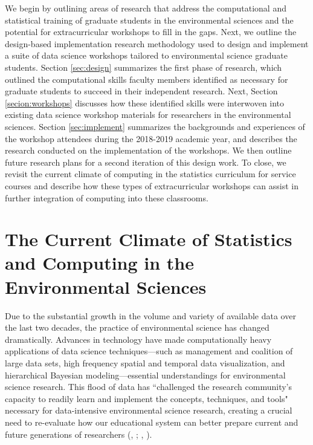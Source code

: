 \documentclass[12pt]{article}
\begin{document}
\quad We begin by outlining areas of research that address the computational and
statistical training of graduate students in the environmental sciences and the 
potential for extracurricular workshops to fill in the gaps. Next, we outline 
the design-based implementation research methodology used to design and 
implement a suite of data science workshops tailored to environmental science 
graduate students. Section \ref{sec:design} summarizes the first phase of 
research, which outlined the computational skills faculty members identified as 
necessary for graduate students to succeed in their independent research. Next, 
Section \ref{secion:workshops} discusses how these identified skills were 
interwoven into existing data science workshop materials for researchers in the 
environmental sciences. Section \ref{sec:implement} summarizes the backgrounds 
and experiences of the workshop attendees during the 2018-2019 academic year, 
and describes the research conducted on the implementation of the workshops. We 
then outline future research plans for a second iteration of this design work. 
To close, we revisit the current climate of computing in the statistics 
curriculum for service courses and describe how these types of extracurricular 
workshops can assist in further integration of computing into these classrooms. 

\section{The Current Climate of Statistics and Computing in the Environmental 
Sciences}
\label{sec:lit}

\quad Due to the substantial growth in the volume and variety of available data 
over the last two decades, the practice of environmental science has changed 
dramatically. Advances in technology have made computationally heavy 
applications of data science techniques---such as management and coalition of 
large data sets, high frequency spatial and temporal data visualization, and 
hierarchical Bayesian modeling---essential understandings for environmental 
science research. This flood of data has ``challenged the research community's 
capacity to readily learn and implement the concepts, techniques, and tools" 
\citep[p. 546]{hampton} necessary for data-intensive environmental science 
research, creating a crucial need to re-evaluate how our educational system can
better prepare current and future generations of researchers 
(\citeauthor{green}, \citeyear{green}; \citeauthor{hampton}, 
\citeyear{hampton}).  
\end{document}
